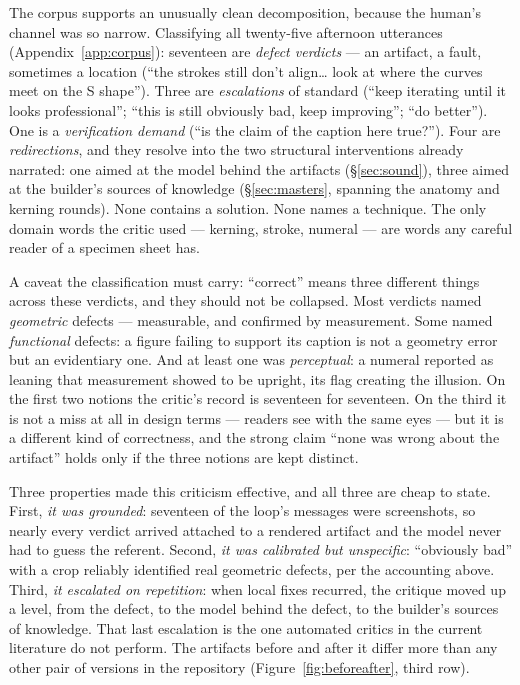 \documentclass[11pt]{article}
\begin{document}
The corpus supports an unusually clean decomposition, because the human's channel was so narrow. Classifying all twenty-five afternoon utterances (Appendix~\ref{app:corpus}): seventeen are \emph{defect verdicts} — an artifact, a fault, sometimes a location (``the strokes still don't align\ldots{} look at where the curves meet on the S shape''). Three are \emph{escalations} of standard (``keep iterating until it looks professional''; ``this is still obviously bad, keep improving''; ``do better''). One is a \emph{verification demand} (``is the claim of the caption here true?''). Four are \emph{redirections}, and they resolve into the two structural interventions already narrated: one aimed at the model behind the artifacts (\S\ref{sec:sound}), three aimed at the builder's sources of knowledge (\S\ref{sec:masters}, spanning the anatomy and kerning rounds). None contains a solution. None names a technique. The only domain words the critic used — kerning, stroke, numeral — are words any careful reader of a specimen sheet has.

A caveat the classification must carry: ``correct'' means three different things across these verdicts, and they should not be collapsed. Most verdicts named \emph{geometric} defects — measurable, and confirmed by measurement. Some named \emph{functional} defects: a figure failing to support its caption is not a geometry error but an evidentiary one. And at least one was \emph{perceptual}: a numeral reported as leaning that measurement showed to be upright, its flag creating the illusion. On the first two notions the critic's record is seventeen for seventeen. On the third it is not a miss at all in design terms — readers see with the same eyes — but it is a different kind of correctness, and the strong claim ``none was wrong about the artifact'' holds only if the three notions are kept distinct.

Three properties made this criticism effective, and all three are cheap to state. First, \emph{it was grounded}: seventeen of the loop's messages were screenshots, so nearly every verdict arrived attached to a rendered artifact and the model never had to guess the referent. Second, \emph{it was calibrated but unspecific}: ``obviously bad'' with a crop reliably identified real geometric defects, per the accounting above. Third, \emph{it escalated on repetition}: when local fixes recurred, the critique moved up a level, from the defect, to the model behind the defect, to the builder's sources of knowledge. That last escalation is the one automated critics in the current literature do not perform. The artifacts before and after it differ more than any other pair of versions in the repository (Figure~\ref{fig:beforeafter}, third row).
\end{document}
